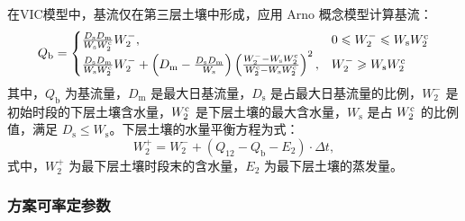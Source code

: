     在VIC模型中，基流仅在第三层土壤中形成，应用 Arno 概念模型计算基流：
    \begin{equation}
      Q_{\mathrm {b}}  = 
      \begin{cases}
        \frac{D_{\mathrm {s}}  D_{\mathrm {m}} }{W_{\mathrm {s}}  W_2^{\rm c}} W_2^-, & 0 \leqslant W_2^- \leqslant W_{\mathrm {s}}  W_2^{\rm c} \\
        \frac{D_{\mathrm {s}}  D_{\mathrm {m}} }{W_{\mathrm {s}}  W_2^{\rm c}} W_2^- + \left(D_{\mathrm {m}}  - \frac{D_{\mathrm {s}}  D_{\mathrm {m}} }{W_{\mathrm {s}} }\right) \left(\frac{W_2^--W_{\mathrm {s}}  W_2^{\rm c}}{W_2^{\rm c}-W_{\mathrm {s}}  W_2^{\rm c}}\right)^2,  & W_2^- \geqslant W_{\mathrm {s}}  W_2^{\rm c}
      \end{cases}
    \end{equation}
    其中，$Q_{\mathrm {b}} $ 为基流量，$D_{\mathrm {m}} $ 是最大日基流量，$D_{\mathrm {s}} $ 是占最大日基流量的比例，$W_2^-$ 是初始时段的下层土壤含水量，$W_2^{\rm c}$ 是下层土壤的最大含水量，$W_{\mathrm {s}} $ 是占 $W_2^{\rm c}$ 的比例值，满足 $D_{\mathrm {s}} \leqslant W_{\mathrm {s}} $。下层土壤的水量平衡方程为式：
    \begin{equation}
      W_2^+ = W_2^- + (Q_{12} - Q_{\mathrm {b}}  -E_2)\cdot\Delta t,
    \end{equation}
    式中，$W_2^+$ 为最下层土壤时段末的含水量，$E_2$ 为最下层土壤的蒸发量。

\subsubsection{方案可率定参数}

